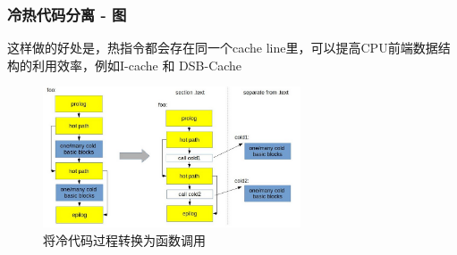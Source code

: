 \begin{frame}
    \frametitle{冷热代码分离 - 图}
这样做的好处是，热指令都会存在同一个cache line里，可以提高CPU前端数据结构的利用效率，例如I-cache 和 DSB-Cache
    \begin{figure}
        \centering
        \includegraphics[width=0.68\textwidth]{images/splitting.png}
\caption{将冷代码过程转换为函数调用}
    \end{figure}

\end{frame}